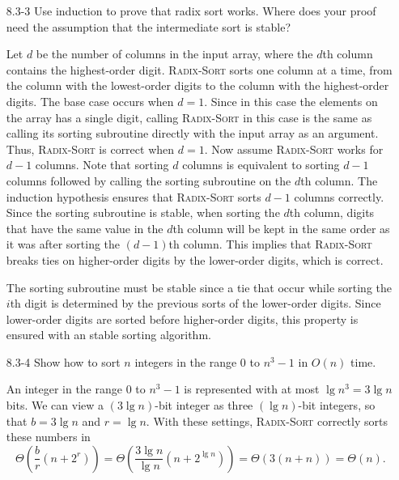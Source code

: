 \documentclass{report}
\makeatletter
\renewenvironment{framed}{%
 \def\FrameCommand##1{\hskip\@totalleftmargin
 \fboxsep=\FrameSep\fbox{##1}}%
 \MakeFramed {\advance\hsize-\width
   \@totalleftmargin\z@ \linewidth\hsize
   \@setminipage}}%
 {\par\unskip\endMakeFramed}
\makeatother
\begin{document}
\begin{enumerate}
\item[8.3-3]{Use induction to prove that radix sort works. Where does your proof
need the assumption that the intermediate sort is stable?}

\begin{framed}
Let $d$ be the number of columns in the input array, where the $d$th column
contains the highest-order digit. \textsc{Radix-Sort} sorts one column at
a time, from the column with the lowest-order digits to the column with the
highest-order digits. The base case occurs when $d = 1$. Since in this case the
elements on the array has a single digit, calling \textsc{Radix-Sort} in this
case is the same as calling its sorting subroutine directly with the input array
as an argument. Thus, \textsc{Radix-Sort} is correct when $d = 1$. Now assume
\textsc{Radix-Sort} works for $d - 1$ columns. Note that sorting $d$ columns is
equivalent to sorting $d - 1$ columns followed by calling the sorting subroutine
on the $d$th column. The induction hypothesis ensures that \textsc{Radix-Sort}
sorts $d - 1$ columns correctly. Since the sorting subroutine is stable, when
sorting the $d$th column, digits that have the same value in the $d$th column
will be kept in the same order as it was after sorting the $(d - 1)$th column.
This implies that \textsc{Radix-Sort} breaks ties on higher-order digits by the
lower-order digits, which is correct.

The sorting subroutine must be stable since a tie that occur while sorting the
$i$th digit is determined by the previous sorts of the lower-order digits. Since
lower-order digits are sorted before higher-order digits, this property is
ensured with an stable sorting algorithm.
\end{framed}

\item[8.3-4]{Show how to sort $n$ integers in the range $0$ to $n^3 - 1$ in
$O(n)$ time.}

\begin{framed}
An integer in the range $0$ to $n^3 - 1$ is represented with at most
$\lg n^3 = 3 \lg n$ bits. We can view a $(3 \lg n)$-bit integer as three
$(\lg n)$-bit integers, so that $b = 3 \lg n$ and $r = \lg n$. With these
settings, \textsc{Radix-Sort} correctly sorts these numbers in
\[
  \Theta\left( \frac{b}{r} \left( n + 2^r \right) \right)
  = \Theta\left( \frac{3 \lg n}{\lg n} \left(n + 2^{\lg n}\right) \right)
  = \Theta( 3 (n + n) )
  = \Theta(n).
\]
\end{framed}


\end{enumerate}
\end{document}
